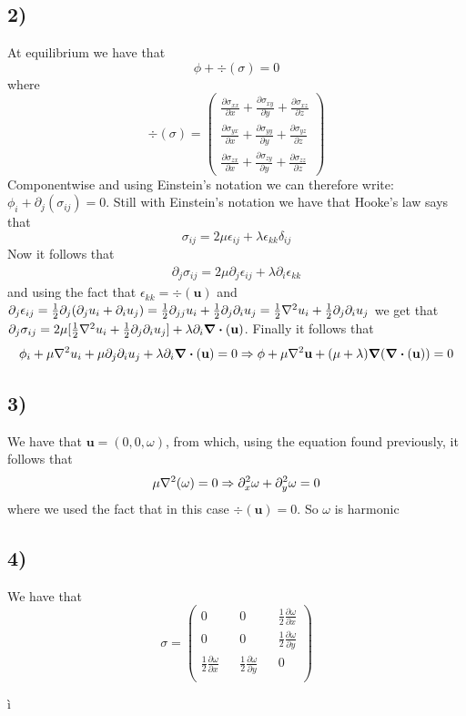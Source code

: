\documentclass[10pt,a4paper]{book}
\begin{document}
\subsection*{2)}
At equilibrium we have that 
$$\phi+\div(\sigma)=0$$
where $$\div(\sigma)=\begin{pmatrix}
\frac{\partial \sigma_{xx}}{\partial x}+\frac{\partial \sigma_{xy}}{\partial y}+\frac{\partial \sigma_{xz}}{\partial z}\\
\frac{\partial \sigma_{yx}}{\partial x}+\frac{\partial \sigma_{yy}}{\partial y}+\frac{\partial \sigma_{yz}}{\partial z}\\
\frac{\partial \sigma_{zx}}{\partial x}+\frac{\partial \sigma_{zy}}{\partial y}+\frac{\partial \sigma_{zz}}{\partial z}
\end{pmatrix}$$Componentwise and using Einstein's notation we can therefore write: $\phi_i+\partial_j(\sigma_{ij})=0$.
Still with Einstein's notation we have that Hooke's law says that 
$$\sigma_{ij}=2\mu \epsilon_{ij}+\lambda \epsilon_{kk}\delta_{ij}$$
Now it follows that 
\begin{align*}
\partial_j\sigma_{ij}=2\mu\partial_j\epsilon_{ij}+\lambda \partial_i\epsilon_{kk}
\end{align*}
and using the fact that $\epsilon_{kk}=\div(\mathbf{u})$ and $\partial_j\epsilon_{ij}=\frac{1}{2}\partial_j(\partial_j u_i+\partial_i u_j)=\frac{1}{2}\partial_{jj}u_i+\frac{1}{2}\partial_j\partial_i u_j=\frac{1}{2}\laplacian u_i+\frac{1}{2}\partial_j\partial_i u_j$
we get that
$\partial_j\sigma_{ij}=2\mu[ \frac{1}{2}\laplacian u_i+\frac{1}{2}\partial_j\partial_i u_j]+\lambda\partial_i\div(\mathbf{u})$. Finally it follows that
\begin{align*}
\phi_i+\mu\laplacian u_i+\mu\partial_j\partial_i u_j +\lambda\partial_i\div(\mathbf{u})=0\Rightarrow \phi+\mu\laplacian \mathbf{u}+(\mu+\lambda)\grad(\div(\mathbf{u}))=0
\end{align*}



\subsection*{3)}
We have that $\mathbf{u}=(0,0,\omega)$,
from which, using the equation found previously, it follows that 
$$\mu\laplacian(\omega)=0\Rightarrow\partial^2_x\omega+\partial^2_y\omega=0$$
where we used the fact that in this case $\div(\mathbf{u})=0$. So $\omega$ is harmonic


\subsection*{4)}
We have that 
$$\sigma=\begin{pmatrix}
0 && 0 && \frac{1}{2}\frac{\partial \omega}{\partial x}\\
0 && 0 && \frac{1}{2}\frac{\partial \omega}{\partial y}\\
\frac{1}{2}\frac{\partial \omega}{\partial x} && \frac{1}{2}\frac{\partial \omega}{\partial y} && 0\\
\end{pmatrix}$$




ì
\end{document}
